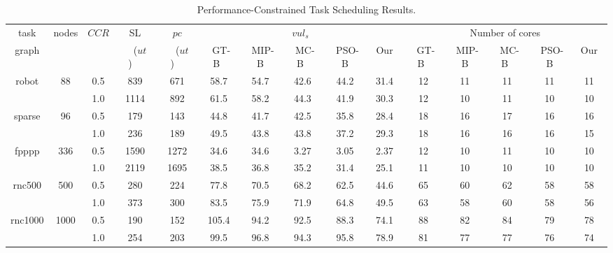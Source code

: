 \documentclass[10pt,journal, compsoc]{IEEEtran}
\begin{document}
\begin{table}[!t]
\renewcommand{\arraystretch}{1.1}
\caption{Performance-Constrained Task Scheduling Results.}
\centering
\begin{tabular}{c|c|c|c|c|ccccc|ccccc}
\hline
\hline
task                        &\multicolumn{1}{c|}{\multirow{2}{*}{nodes}}              &\multicolumn{1}{c|}{\multirow{2}{*}{$CCR$}}     &SL       &$pc$      &\multicolumn{5}{c|}{$vul_s$}        &\multicolumn{5}{c}{Number of cores}       \\ \cline{6-10} \cline{11-15}
graph                       &              &          &~~($ut$)~~   &~~($ut$)~~     &~GT-B~  &~MIP-B  &~MC-B~  &~PSO-B   &~Our~      &~GT-B~  &~MIP-B  &~MC-B~  &~PSO-B  &~Our~     \\

\hline
\hline

\multicolumn{1}{c|}{\multirow{2}{*}{robot}}   &\multicolumn{1}{c|}{\multirow{2}{*}{88}}    &0.5  &839   &671      &58.7    &54.7 &42.6 &44.2  &31.4         &12  &11 &11  &11  &11               \\
                                              &    &1.0  &1114  &892     &61.5    &58.2  &44.3 &41.9  &30.3         &12  &10 &11  &10  &10              \\
\hline

\multicolumn{1}{c|}{\multirow{2}{*}{sparse}}  &\multicolumn{1}{c|}{\multirow{2}{*}{96}}    &0.5 &179  &143     &44.8   &41.7 &42.5  &35.8  &28.4        &18  &16 &17  &16  &16        \\
                                              &    &1.0 &236  &189     &49.5   &43.8  &43.8 &37.2  &29.3        &18  &16 &16  &16  &15            \\

\hline

\multicolumn{1}{c|}{\multirow{2}{*}{fpppp}}    &\multicolumn{1}{c|}{\multirow{2}{*}{336}}    &0.5 &1590  &1272      &34.6   &34.6  &3.27  &3.05  &2.37       &12  &10  &11  &10  &10             \\
                                               &     &1.0 &2119  &1695     &38.5   &36.8  &35.2  &31.4  &25.1       &11  &10  &10  &10  &10              \\

\hline
\multicolumn{1}{c|}{\multirow{2}{*}{rnc500}}  &\multicolumn{1}{c|}{\multirow{2}{*}{500}}    &0.5 &280 &224        &77.8     &70.5  &68.2  &62.5  &44.6      &65  &60  &62  &58  &58              \\
                                              &    &1.0  &373  &300      &83.5     &75.9 &71.9   &64.8  &49.5      &63  &58  &60  &58  &56               \\
\hline
\multicolumn{1}{c|}{\multirow{2}{*}{rnc1000}}  &\multicolumn{1}{c|}{\multirow{2}{*}{1000}}   &0.5 &190 &152    &105.4  &94.2 &92.5   &88.3  &74.1       &88 &82  &84  &79  &78            \\
                                               &   &1.0 &254  &203   &99.5  &96.8  &94.3  &95.8  &78.9       &81 &77  &77  &76  &74            \\


\end{tabular}
\end{table}
\end{document}
